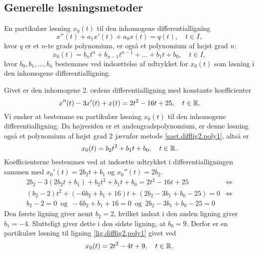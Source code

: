 \subsection{Generelle løsningsmetoder}

\begin{method}[Polynomium] \label{saet.difflig2.poly1}
En partikulær løsning $ x_0(t) $ til den inhomogene differentialligning
\begin{equation}
x''(t) + a_1x'(t) + a_0x(t) = q(t), \quad t \in I,
\end{equation}
hvor $ q $ er et $ n $-te grads polynomium, er også et polynomium af højst grad $ n $:
\begin{equation}
x_0(t) = b_n t^n + b_{n-1} t^{n-1} + \ldots + b_1 t + b_0, \quad t \in I,
\end{equation}
hvor $ b_0,b_1,\ldots,b_n $ bestemmes ved indsættelse af udtrykket for $ x_0(t) $ som løsning i den inhomogene differentialligning.
\end{method}

\begin{example}[Polynomium] \label{eks.difflig2.poly1}
Givet er den inhomogene 2. ordens differentialligning med konstante koefficienter
\begin{equation}
x''(t) - 3x'(t) + x(t) = 2t^2 - 16t + 25, \quad t \in \mathbb{R}. \label{lig.difflig2.poly1}
\end{equation}
Vi ønsker at bestemme en partikulær løsning $ x_0(t) $ til den inhomogene differentialligning. Da højresiden er et andengradspolynomium, er denne løsning også et polynomium af højst grad 2 jævnfør metode \ref{saet.difflig2.poly1}, altså er
\begin{equation}
x_0(t) = b_2t^2 + b_1t + b_0, \quad t \in \mathbb{R}.
\end{equation}
Koefficienterne bestemmes ved at indsætte udtrykket i differentialligningen sammen med $ x_0'(t) = 2b_2t + b_1 $ og $ x_0''(t) = 2b_2 $.
\begin{equation}
\begin{aligned}
2b_2 - 3(2b_2t + b_1) + b_2t^2 + b_1t + b_0 = 2t^2 - 16t + 25 & \Leftrightarrow \\
(b_2 - 2)t^2 + (-6b_2 + b_1 + 16)t + (2b_2 - 3b_1 + b_0 - 25) = 0 & \Leftrightarrow \\
b_2 - 2 = 0 \,\,\,\mathrm{og}\,\,\, -6b_2 + b_1 + 16 = 0 \,\,\,\mathrm{og}\,\,\, 2b_2 - 3b_1 + b_0 - 25 = 0 &
\end{aligned}
\end{equation}
Den første ligning giver nemt $ b_2 = 2 $, hvilket indsat i den anden ligning giver $ b_1 = -4 $. Slutteligt giver dette i den sidste ligning, at $ b_0 = 9 $. Derfor er en partikulær løsning til ligning \eqref{lig.difflig2.poly1} givet ved
\begin{equation}
x_0(t) = 2t^2 - 4t + 9, \quad t \in \mathbb{R}.
\end{equation}
\end{example}

